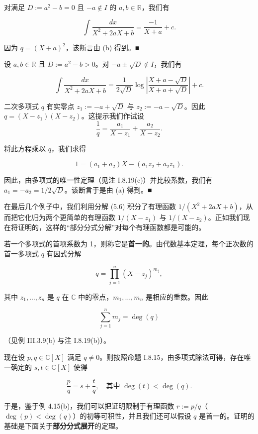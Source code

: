 \begin{example}
\begin{items}
\item

对满足 $ D := a^2 - b = 0 $ 且 $ -a \notin I $ 的 $ a, b \in \mathbb{R} $，我们有

\[
\int \frac{dx}{X^2 + 2aX + b} = \frac{-1}{X + a} + c .
\]

\proofhead
因为 $ q = (X + a)^2 $，该断言由 (b) 得到。\nobreak\hspace{0.35em}■
\item

设 $ a, b \in \mathbb{R} $ 且 $ D := a^2 - b > 0 $。对 $ -a \pm \sqrt{D} \notin I $，我们有

\[
\int \frac{dx}{X^2 + 2aX + b} = \frac{1}{2\sqrt{D}} \log \left| \frac{X + a - \sqrt{D}}{X + a + \sqrt{D}} \right| + c .
\]

\proofhead
二次多项式 $ q $ 有实零点 $ z_1 := -a + \sqrt{D} $ 与 $ z_2 := -a - \sqrt{D} $。因此 $ q = (X - z_1)(X - z_2) $。这提示我们作试设
\begin{equation}
\frac{1}{q} = \frac{a_1}{X - z_1} + \frac{a_2}{X - z_2} .\tag{5.6}
\end{equation}

将此方程乘以 $ q $，我们求得

\[
1 = (a_1 + a_2)X - (a_1 z_2 + a_2 z_1) .
\]

因此，由多项式的唯一性定理（见注 I.8.19(c)）并比较系数，我们有 $ a_1 = -a_2 = 1/2\sqrt{D} $。该断言于是由 (a) 得到。\nobreak\hspace{0.35em}■

\end{items}

在最后几个例子中，我们利用分解 (5.6) 积分了有理函数 $ 1/(X^2 + 2aX + b) $，从而把它化归为两个更简单的有理函数 $ 1/(X - z_1) $ 与 $ 1/(X - z_2) $。正如我们现在将证明的，这样的“部分分式分解”对每个有理函数都是可能的。

若一个多项式的首项系数为 1，则称它是\textbf{首一的}。由代数基本定理，每个正次数的首一多项式 $ q $ 有因式分解

\begin{equation}
q = \prod_{j=1}^{n} (X - z_j)^{m_j} ,\tag{5.7}
\end{equation}

其中 $ z_1, \ldots, z_n $ 是 $ q $ 在 $ \mathbb{C} $ 中的零点，$ m_1, \ldots, m_n $ 是相应的重数。因此

\[
\sum_{j=1}^{n} m_j = \deg(q)
\]

（见例 III.3.9(b) 与注 I.8.19(b)）。

现在设 $ p, q \in \mathbb{C}[X] $ 满足 $ q \ne 0 $。则按照命题 I.8.15，由多项式除法可得，存在唯一确定的 $ s, t \in \mathbb{C}[X] $ 使得

\begin{equation}
\frac{p}{q} = s + \frac{t}{q} , \quad \text{其中 } \deg(t) < \deg(q) .\tag{5.8}
\end{equation}

于是，鉴于例 4.15(b)，我们可以把证明限制于有理函数 $ r := p/q $（$ \deg(p) < \deg(q) $）的初等可积性，并且我们还可以假设 $ q $ 是首一的。证明的基础是下面关于\textbf{部分分式展开}的定理。

\end{example}

